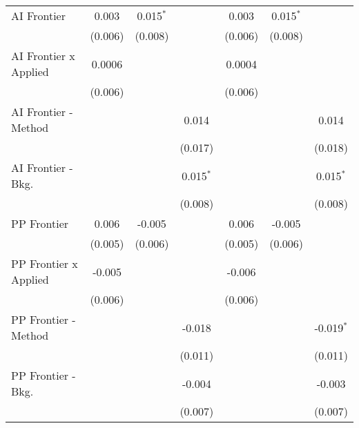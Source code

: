 \begin{tabular}{lcccccc}
   AI Frontier                  & 0.003          & 0.015$^{*}$  &              & 0.003          & 0.015$^{*}$  &   \\   
                                & (0.006)        & (0.008)      &              & (0.006)        & (0.008)      &   \\   
   AI Frontier x Applied        & 0.0006         &              &              & 0.0004         &              &   \\   
                                & (0.006)        &              &              & (0.006)        &              &   \\   
   AI Frontier - Method         &                &              & 0.014        &                &              & 0.014\\   
                                &                &              & (0.017)      &                &              & (0.018)\\   
   AI Frontier - Bkg.           &                &              & 0.015$^{*}$  &                &              & 0.015$^{*}$\\   
                                &                &              & (0.008)      &                &              & (0.008)\\   
   PP Frontier                  & 0.006          & -0.005       &              & 0.006          & -0.005       &   \\   
                                & (0.005)        & (0.006)      &              & (0.005)        & (0.006)      &   \\   
   PP Frontier x Applied        & -0.005         &              &              & -0.006         &              &   \\   
                                & (0.006)        &              &              & (0.006)        &              &   \\   
   PP Frontier - Method         &                &              & -0.018       &                &              & -0.019$^{*}$\\   
                                &                &              & (0.011)      &                &              & (0.011)\\   
   PP Frontier - Bkg.           &                &              & -0.004       &                &              & -0.003\\   
                                &                &              & (0.007)      &                &              & (0.007)\\   

\end{tabular}
